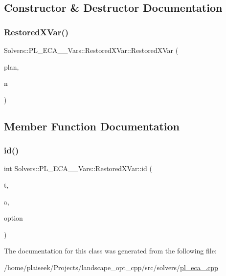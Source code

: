 \subsection{Constructor \& Destructor Documentation}
\mbox{\label{class_solvers_1_1_p_l___e_c_a__2___vars_1_1_restored_x_var_a682003d690eb9fc6ec1d6ac8056c696b}} 
\subsubsection{\texorpdfstring{Restored\+X\+Var()}{RestoredXVar()}}
{\footnotesize\ttfamily Solvers\+::\+P\+L\+\_\+\+E\+C\+A\+\_\+\_\+\+Vars\+::\+Restored\+X\+Var\+::\+Restored\+X\+Var (\begin{DoxyParamCaption}\item[{const \hyperlink{class_restoration_plan}{Restoration\+Plan} \&}]{plan,  }\item[{int}]{n }\end{DoxyParamCaption})\hspace{0.3cm}{\ttfamily [inline]}}



\subsection{Member Function Documentation}
\mbox{\label{class_solvers_1_1_p_l___e_c_a__2___vars_1_1_restored_x_var_af3514307162d916aee89a45d294c7e3d}} 
\subsubsection{\texorpdfstring{id()}{id()}}
{\footnotesize\ttfamily int Solvers\+::\+P\+L\+\_\+\+E\+C\+A\+\_\+\_\+\+Vars\+::\+Restored\+X\+Var\+::id (\begin{DoxyParamCaption}\item[{Graph\+\_\+t\+::\+Node}]{t,  }\item[{Graph\+\_\+t\+::\+Arc}]{a,  }\item[{\hyperlink{class_restoration_plan_1_1_option}{Restoration\+Plan\+::\+Option} $\ast$}]{option }\end{DoxyParamCaption})\hspace{0.3cm}{\ttfamily [inline]}}



The documentation for this class was generated from the following file\+:\begin{DoxyCompactItemize}
\item 
/home/plaiseek/\+Projects/landscape\+\_\+opt\+\_\+cpp/src/solvers/\hyperlink{pl__eca__2_8cpp}{pl\+\_\+eca\+\_.\+cpp}\end{DoxyCompactItemize}
